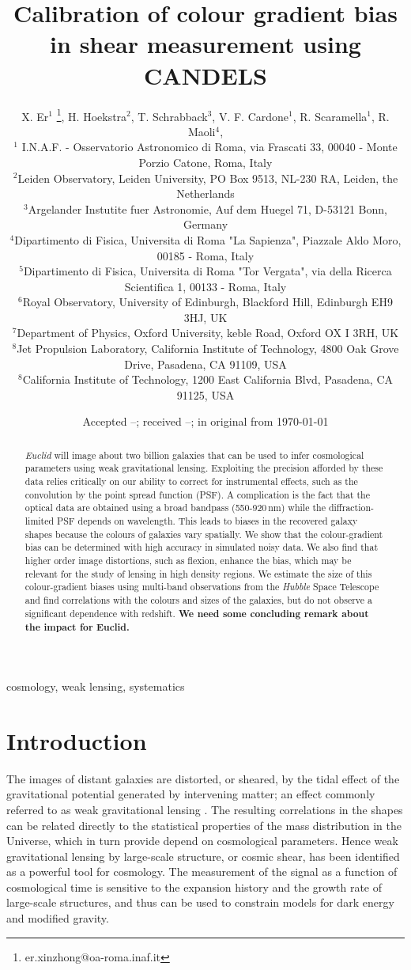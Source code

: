 \documentclass[useAMS,usenatbib]{mnras}
\title[Colour gradient bias]
{Calibration of colour gradient bias in shear measurement using CANDELS}
\author[X. Er et al.]%
{
X. Er$^1$ \thanks{er.xinzhong@oa-roma.inaf.it},
H. Hoekstra$^2$, T. Schrabback$^3$, V. F. Cardone$^1$, R. Scaramella$^1$, R. Maoli$^4$,
\newauthor{M. Vicinanza$^{1,4,5}$, B. Gillis$^{6}$ L. Miller$^{7}$, J. Rhodes$^{8,9}$}
\\
$^1$ I.N.A.F. - Osservatorio Astronomico di Roma, via Frascati 33, 00040 - Monte Porzio Catone, Roma, Italy\\
$^2$Leiden Observatory, Leiden University, PO Box 9513, NL-230 RA, Leiden, the Netherlands \\
$^3$Argelander Instutite fuer Astronomie, Auf dem Huegel 71, D-53121 Bonn, Germany\\
$^4$Dipartimento di Fisica, Universita di Roma "La Sapienza", Piazzale Aldo Moro, 00185 - Roma, Italy\\
$^5$Dipartimento di Fisica, Universita di Roma "Tor Vergata", via della Ricerca Scientifica 1, 00133 - Roma, Italy\\
$^6$Royal Observatory, University of Edinburgh, Blackford Hill, Edinburgh EH9 3HJ, UK\\
$^7$Department of Physics, Oxford University, keble Road, Oxford OX I 3RH, UK\\
$^8$Jet Propulsion Laboratory, California Institute of Technology, 4800 Oak Grove Drive, Pasadena, CA 91109, USA\\
$^8$California Institute of Technology, 1200 East California Blvd, Pasadena, CA 91125, USA
}
\date{Accepted --;  received --;  in original from \today}
\begin{document}
\maketitle

\begin{abstract}
{\it Euclid} will image about two billion galaxies that can be used to infer cosmological
parameters using weak gravitational lensing. Exploiting the precision afforded by these
data relies critically on our ability to correct for instrumental effects, such as the convolution
by the point spread function (PSF). A complication is the fact  that the optical data
are obtained using a broad bandpass (550-920\,nm) while the diffraction-limited PSF depends
on wavelength. This leads to biases in the recovered galaxy shapes because the colours of 
galaxies vary spatially.  We show that the colour-gradient bias can be determined with high accuracy in simulated
noisy data. We also find that higher order image distortions, such as flexion, enhance
the bias, which may be relevant for the study of lensing in high density regions.
We estimate the size of this colour-gradient biases using multi-band observations 
from the {\it Hubble} Space Telescope and find correlations with the colours and sizes of
the galaxies, but do not observe a significant dependence with redshift. 
{\bf We need some concluding remark about the impact for Euclid.}

\end{abstract}
\begin{keywords} cosmology, weak lensing, systematics
\end{keywords}


\section{Introduction}

The images of distant galaxies are distorted, or sheared, by the tidal effect of the gravitational  potential generated by intervening matter; an effect commonly referred to as weak gravitational lensing \citep[see e.g.][for a detailed introduction]{Bartelmann01}. The resulting correlations in the shapes can be related directly to the statistical properties of the mass distribution in the Universe, which in turn provide depend on cosmological parameters. Hence weak gravitational lensing by large-scale structure, or cosmic shear, has been identified as a powerful tool for cosmology. The measurement of the signal as a function of cosmological time is sensitive to the expansion history and the growth rate of large-scale structures, and thus can be used to constrain models for dark energy and modified gravity.
\end{document}
